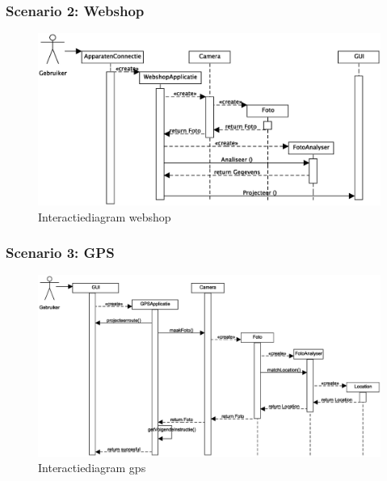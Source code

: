 \documentclass[12pt,a4paper,oneside]{article}
\begin{document}
\subsubsection*{Scenario 2: Webshop}
\begin{figure}[H]
  \begin{center}
    \includegraphics[width=\textwidth]{webshop_sequentie.eps}
    \caption{Interactiediagram webshop}
    \label{graph:graph1}
  \end{center}
\end{figure}

\subsubsection*{Scenario 3: GPS}
\begin{figure}[H]
  \begin{center}
\hspace*{-1.0in}
    \includegraphics[scale=0.4]{gps_sequentie.eps}
    \caption{Interactiediagram gps}
    \label{graph:graph1}
  \end{center}
\end{figure}
\end{document}
